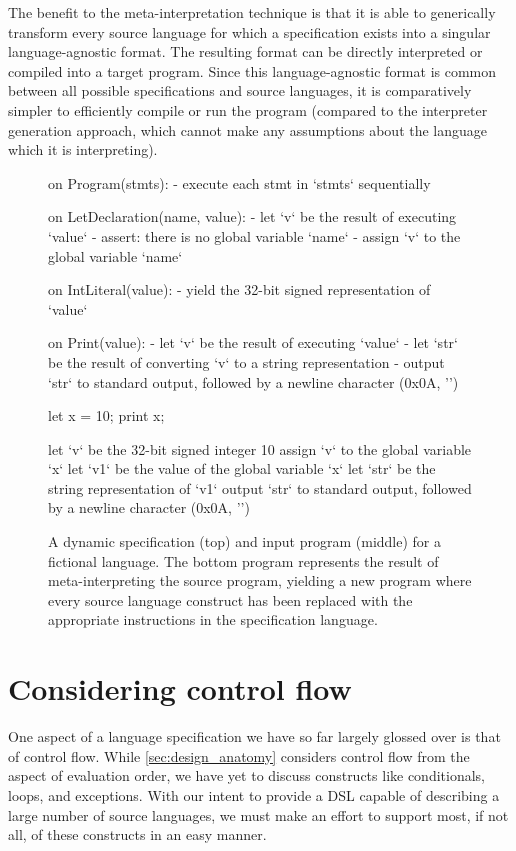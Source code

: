 The benefit to the meta-interpretation technique is that it is able to generically transform every source language for which a specification exists into a singular language-agnostic format. The resulting format can be directly interpreted or compiled into a target program. Since this language-agnostic format is common between all possible specifications and source languages, it is comparatively simpler to efficiently compile or run the program (compared to the interpreter generation approach, which cannot make any assumptions about the language which it is interpreting).

\begin{figure}
  \begin{plain}
on Program(stmts):
  - execute each stmt in `stmts` sequentially

on LetDeclaration(name, value):
  - let `v` be the result of executing `value`
  - assert: there is no global variable `name`
  - assign `v` to the global variable `name`

on IntLiteral(value):
  - yield the 32-bit signed representation of `value`

on Print(value):
  - let `v` be the result of executing `value`
  - let `str` be the result of converting `v` to a string representation
  - output `str` to standard output, followed by a newline character (0x0A, '\n')
  \end{plain}
  \begin{plain}
let x = 10;
print x;
  \end{plain}
\begin{plain}
let `v` be the 32-bit signed integer 10
assign `v` to the global variable `x`
let `v1` be the value of the global variable `x`
let `str` be the string representation of `v1`
output `str` to standard output, followed by a newline character (0x0A, '\n')
\end{plain}
  \caption{A dynamic specification (top) and input program (middle) for a fictional language. The bottom program represents the result of meta-interpreting the source program, yielding a new program where every source language construct has been replaced with the appropriate instructions in the specification language.}
  \label{fig:meta_interpretation}
\end{figure}

\section{Considering control flow}
\label{sec:design_control_flow}
One aspect of a language specification we have so far largely glossed over is that of control flow. While \cref{sec:design_anatomy} considers control flow from the aspect of evaluation order, we have yet to discuss constructs like conditionals, loops, and exceptions. With our intent to provide a \ac{DSL} capable of describing a large number of source languages, we must make an effort to support most, if not all, of these constructs in an easy manner.

